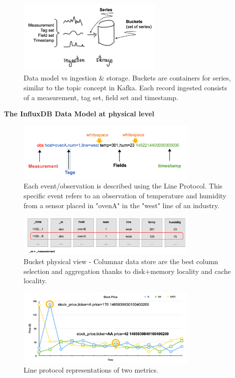 \documentclass[10pt,a4paper]{article}
\begin{document}
    \begin{figure}[ht!]
 \hfill \includegraphics[width=200pt]{images/influxdb-data-model-ingestion}
 \hspace*{\fill}
 \caption{Data model vs ingestion \& storage. Buckets are containers for series, similar to the topic  concept in Kafka. Each record ingested consists of a measurement, tag set, field set and timestamp.}
 \end{figure} 
 \pagebreak
 \textbf{The InfluxDB Data Model at physical level}
     \begin{figure}[ht!]
 \hfill \includegraphics[width=250pt]{images/influxdb-line-protocol}
 \hspace*{\fill}
 \caption{Each event/observation is described using the Line Protocol. This specific event refers to an observation of temperature and humidity from a sensor placed in "ovenA" in the "west" line of an industry.}
 \end{figure} 
     \begin{figure}[ht!]
 \hfill \includegraphics[width=250pt]{images/influxdb-bucket-columnar}
 \hspace*{\fill}
 \caption{Bucket physical view - Columnar data store are the best column selection and aggregation thanks to disk+memory locality and cache locality.}
 \end{figure} 
      \begin{figure}[ht!]
 \hfill \includegraphics[width=250pt]{images/influxdb-line-protocol-ex}
 \hspace*{\fill}
 \caption{Line protocol representations of two metrics.}
 \end{figure}  \\
\end{document}
